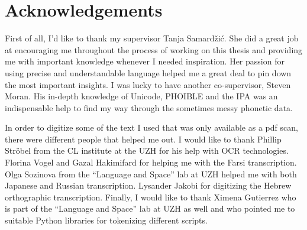 {}
\chapter*{Acknowledgements}
First of all, I'd like to thank my supervisor Tanja Samardžić. She did a great job at encouraging me throughout the process of working on this thesis and providing me with important knowledge whenever I needed inspiration. Her passion for using precise and understandable language helped me a great deal to pin down the most important insights. I was lucky to have another co-supervisor, Steven Moran. His in-depth knowledge of Unicode, PHOIBLE and the IPA was an indispensable help to find my way through the sometimes messy phonetic data.

In order to digitize some of the text I used that was only available as a pdf scan, there were different people that helped me out. I would like to thank Phillip Ströbel from the CL institute at the UZH for his help with OCR technologies. Florina Vogel and Gazal Hakimifard for helping me with the Farsi transcription. Olga Sozinova from the ``Language and Space'' lab at UZH helped me with both Japanese and Russian transcription. Lysander Jakobi for digitizing the Hebrew orthographic transcription. Finally, I would like to thank Ximena Gutierrez who is part of the ``Language and Space'' lab at UZH as well and who pointed me to suitable Python libraries for tokenizing different scripts.
\newpage